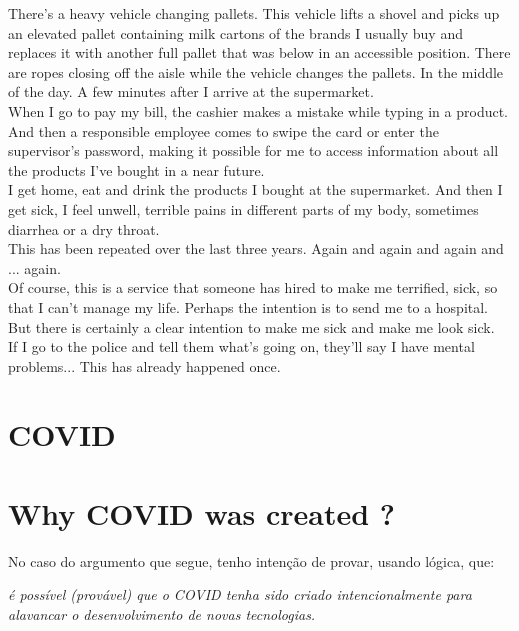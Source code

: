 \documentclass[11pt]{book}
\begin{document}
\noindent There's a heavy vehicle changing pallets. This vehicle lifts a shovel and picks up an elevated pallet containing milk cartons of the brands I usually buy and replaces it with another full pallet that was below in an accessible position.  There are ropes closing off the aisle while the vehicle changes the pallets. In the middle of the day. A few minutes after I arrive at the supermarket. \\

\noindent When I go to pay my bill, the cashier makes a mistake while typing in a product. And then a responsible employee comes to swipe the card or enter the supervisor's password, making it possible for me to access information about all the products I've bought in a near future. \\

\noindent I get home, eat and drink the products I bought at the supermarket. And then I get sick, I feel unwell, terrible pains in different parts of my body, sometimes diarrhea or a dry throat. \\

\noindent This has been repeated over the last three years. Again and again and again and ... again. \\

\noindent Of course, this is a service that someone has hired to make me terrified, sick, so that I can't manage my life. Perhaps the intention is to send me to a hospital. But there is certainly a clear intention to make me sick and make me look sick. \\

\noindent If I go to the police and tell them what's going on, they'll say I have mental problems... This has already happened once. \\




\chapter{COVID}


\chapter{Why COVID was created ?}

No caso do argumento que segue, tenho intenção de provar, usando lógica, que: \\

\noindent \begin{center} \emph{é possível (provável) que o COVID tenha sido criado intencionalmente para alavancar o desenvolvimento de novas tecnologias.} \end{center}
\end{document}
